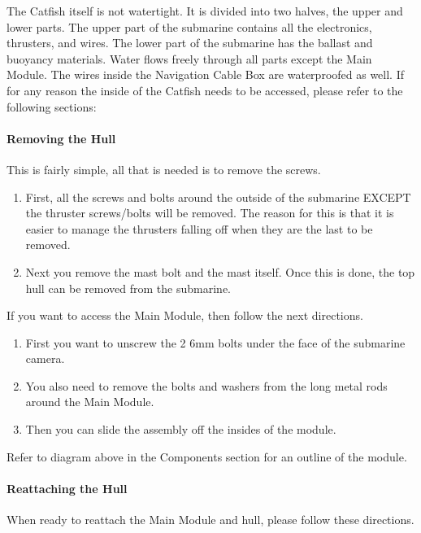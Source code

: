 \documentclass[
18pt, %
a4paper, %
oneside, %
headinclude,footinclude, %
]{scrartcl}
\begin{document}
The Catfish itself is not watertight. It is divided into two halves, the upper and lower parts. The upper part of the submarine contains all the electronics, thrusters, and wires. The lower part of the submarine has the ballast and buoyancy materials. Water flows freely through all parts except the Main Module. The wires inside the Navigation Cable Box are waterproofed as well. If for any reason the inside of the Catfish needs to be accessed, please refer to the following sections: 

\paragraph{Removing the Hull} This is fairly simple, all that is needed is to remove the screws. 

\begin{enumerate}
	\item First, all the screws and bolts around the outside of the submarine EXCEPT the thruster screws/bolts will be removed. The reason for this is that it is easier to manage the thrusters falling off when they are the last to be removed. 
	\item Next you remove the mast bolt and the mast itself. Once this is done, the top hull can be removed from the submarine. \\
\end{enumerate}
	If you want to access the Main Module, then follow the next directions. 
\begin{enumerate}
	\item First you want to unscrew the 2 6mm bolts under the face of the submarine camera. 
	\item You also need to remove the bolts and washers from the long metal rods around the Main Module. 
	\item Then you can slide the assembly off the insides of the module.
\end{enumerate}

 Refer to diagram above in the Components section for an outline of the module.
 
\paragraph{Reattaching the Hull} When ready to reattach the Main Module and hull, please follow these directions. \\
\end{document}
